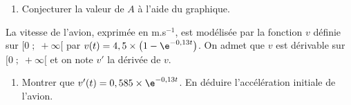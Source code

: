 \begin{enumerate}[resume]
\item Conjecturer la valeur de $A$ à l'aide du graphique.
\end{enumerate}

La vitesse de l'avion, exprimée en m.s$^{-1}$, est modélisée par la fonction $v$ définie sur $[0\;;\;+\infty[$ par $v(t)=4,5\times \left ( 1-\e^{-0,13t} \right )$. On admet que $v$ est dérivable sur $[0\;;\;+\infty[$ et on note $v'$ la dérivée de $v$.

\begin{enumerate}[resume]
\item  Montrer que $v'(t)=0,585 \times \e^{-0,13t}$. En déduire l'accélération initiale de l'avion.
\end{enumerate}

\bigskip
